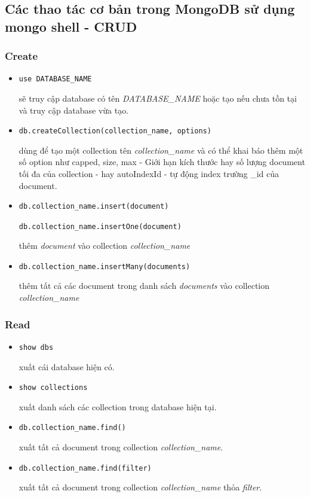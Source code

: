 \subsection{Các thao tác cơ bản trong MongoDB sử dụng mongo shell - CRUD}
\subsubsection{Create}
\begin{itemize}
\item 
\begin{lstlisting} 
use DATABASE_NAME
\end{lstlisting}
sẽ truy cập database có tên \textit{DATABASE\_NAME} hoặc tạo nếu chưa tồn tại và truy cập database vừa tạo.
\item 
\begin{lstlisting}
db.createCollection(collection_name, options)
\end{lstlisting}
dùng để tạo một collection tên \textit{collection\_name} và có thể khai báo thêm một số option như capped, size, max - Giới hạn kích thước hay số lượng document tối đa của collection - hay autoIndexId - tự động index trường \_id của document.
\item
\begin{lstlisting}
db.collection_name.insert(document)

db.collection_name.insertOne(document)
\end{lstlisting}
thêm \textit{document} vào collection \textit{collection\_name}
\item
\begin{lstlisting}
db.collection_name.insertMany(documents)
\end{lstlisting}
thêm tất cả các document trong danh sách \textit{documents} vào collection \textit{collection\_name}
\end{itemize}
\subsubsection{Read}
\begin{itemize}
\item
\begin{lstlisting}
show dbs
\end{lstlisting}
xuất cái database hiện có.
\item
\begin{lstlisting}
show collections
\end{lstlisting}
xuất danh sách các collection trong database hiện tại.
\item
\begin{lstlisting}
db.collection_name.find()
\end{lstlisting}
xuất tất cả document trong collection \textit{collection\_name}.
\item
\begin{lstlisting}
db.collection_name.find(filter)
\end{lstlisting}
xuất tất cả document trong collection \textit{collection\_name} thỏa \textit{filter}.
\end{itemize}

